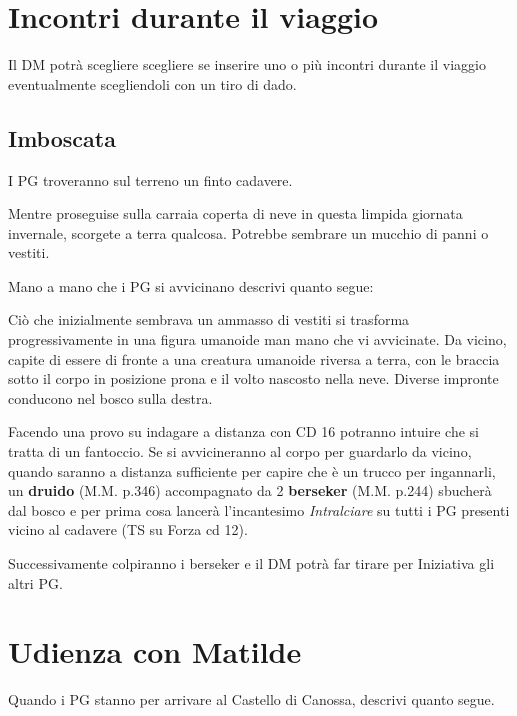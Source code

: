\documentclass[letterpaper,twocolumn,openany,nodeprecatedcode]{dndbook}
\begin{document}
\section{Incontri durante il viaggio}
Il DM potrà scegliere scegliere se inserire uno o più incontri durante il viaggio eventualmente scegliendoli con un tiro di dado.

\subsection{Imboscata}
I PG troveranno sul terreno un finto cadavere.

\begin{DndReadAloud}
Mentre proseguise sulla carraia coperta di neve in questa limpida giornata invernale, scorgete a terra qualcosa. Potrebbe sembrare un mucchio di panni o vestiti.
\end{DndReadAloud}

Mano a mano che i PG si avvicinano descrivi quanto segue:

\begin{DndReadAloud}
Ciò che inizialmente sembrava un ammasso di vestiti si trasforma progressivamente in una figura umanoide man mano che vi avvicinate. Da vicino, capite di essere di fronte a una creatura umanoide riversa a terra, con le braccia sotto il corpo in posizione prona e il volto nascosto nella neve. Diverse impronte conducono nel bosco sulla destra.
\end{DndReadAloud}

Facendo una provo su indagare a distanza con CD 16 potranno intuire che si tratta di un fantoccio. Se si avvicineranno al corpo per guardarlo da vicino, quando saranno a distanza sufficiente per capire che è un trucco per ingannarli, un \textbf{druido} (M.M. p.346) accompagnato da 2 \textbf{berseker} (M.M. p.244) sbucherà dal bosco e per prima cosa lancerà l'incantesimo \textit{Intralciare} su tutti i PG presenti vicino al cadavere (TS su Forza cd 12).

Successivamente colpiranno i berseker e il DM potrà far tirare per Iniziativa gli altri PG.







\section{Udienza con Matilde}
Quando i PG stanno per arrivare al Castello di Canossa, descrivi quanto segue.
\end{document}
